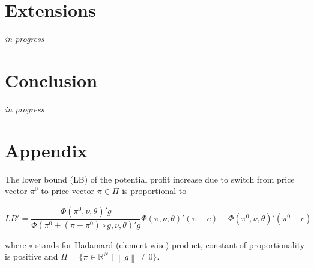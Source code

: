 \documentclass[12pt]{article}
\newcommand\norm[1]{\left\lVert#1\right\rVert}
\begin{document}
\section{Extensions}
\textit{in progress}
\section{Conclusion}
\textit{in progress}

	
\newpage
\section{Appendix}\label{sect7}
\setcounter{proposition}{0}



\begin{proposition}\label{proposition:1}

The lower bound (LB) of the potential profit increase due to switch from price vector $\pi^0$ to price vector $\pi \in \Pi$ is proportional to

\begin{equation*}
LB' = \frac{ \Phi(\pi^0,\nu, \theta)' g}{\Phi(\pi^0 + (\pi - \pi^0) \circ g,\nu, \theta)' g} \Phi(\pi,\nu, \theta)' (\pi-c) - \Phi(\pi^0,\nu, \theta)' (\pi^0 -c)
\end{equation*}

where $\circ$ stands for Hadamard (element-wise) product, constant of proportionality is positive and $\Pi = \{\pi \in  \mathbb{R}^N \mid \norm{g} \neq 0 \}$.

\end{proposition}
\end{document}
